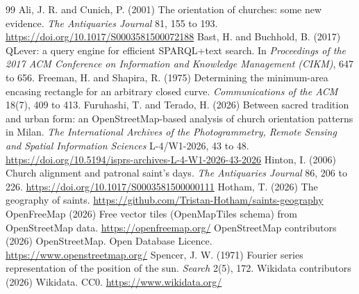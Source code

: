 \documentclass[11pt,a4paper]{article}
\begin{document}
\begin{thebibliography}{99}
 Ali, J. R. and Cunich, P. (2001) The orientation of churches: some new evidence. \textit{The Antiquaries Journal} 81, 155 to 193. \url{https://doi.org/10.1017/S0003581500072188}
 Bast, H. and Buchhold, B. (2017) QLever: a query engine for efficient SPARQL+text search. In \textit{Proceedings of the 2017 ACM Conference on Information and Knowledge Management (CIKM)}, 647 to 656.
 Freeman, H. and Shapira, R. (1975) Determining the minimum-area encasing rectangle for an arbitrary closed curve. \textit{Communications of the ACM} 18(7), 409 to 413.
 Furuhashi, T. and Terado, H. (2026) Between sacred tradition and urban form: an OpenStreetMap-based analysis of church orientation patterns in Milan. \textit{The International Archives of the Photogrammetry, Remote Sensing and Spatial Information Sciences} L-4/W1-2026, 43 to 48. \url{https://doi.org/10.5194/isprs-archives-L-4-W1-2026-43-2026}
 Hinton, I. (2006) Church alignment and patronal saint's days. \textit{The Antiquaries Journal} 86, 206 to 226. \url{https://doi.org/10.1017/S0003581500000111}
 Hotham, T. (2026) The geography of saints. \url{https://github.com/Tristan-Hotham/saints-geography}
 OpenFreeMap (2026) Free vector tiles (OpenMapTiles schema) from OpenStreetMap data. \url{https://openfreemap.org/}
 OpenStreetMap contributors (2026) OpenStreetMap. Open Database Licence. \url{https://www.openstreetmap.org/}
 Spencer, J. W. (1971) Fourier series representation of the position of the sun. \textit{Search} 2(5), 172.
 Wikidata contributors (2026) Wikidata. CC0. \url{https://www.wikidata.org/}
\end{thebibliography}

\appendix
\end{document}
